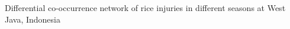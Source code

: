 Differential co-occurrence network of rice injuries in different seasons at West Java, Indonesia
\label{fig:difseasonWJ}